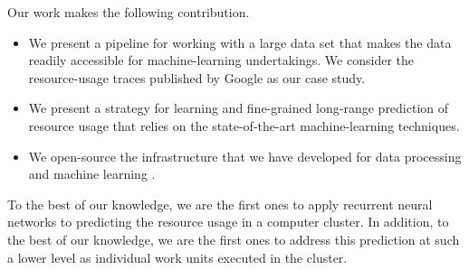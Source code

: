 Our work makes the following contribution.
\begin{itemize}
\item We present a pipeline for working with a large data set that makes the
data readily accessible for machine-learning undertakings. We consider the
resource-usage traces published by Google \cite{reiss2011} as our case study.

\item We present a strategy for learning and fine-grained long-range prediction
of resource usage that relies on the state-of-the-art machine-learning
techniques.

\item We open-source the infrastructure that we have developed for data
processing and machine learning \cite{sources}.
\end{itemize}

To the best of our knowledge, we are the first ones to apply recurrent neural
networks to predicting the resource usage in a computer cluster. In addition, to
the best of our knowledge, we are the first ones to address this prediction at
such a lower level as individual work units executed in the cluster.
